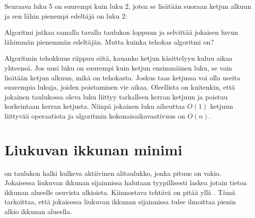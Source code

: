 Seuraava luku 5 on suurempi kuin luku 2,
joten se lisätään suoraan ketjun alkuun ja
sen lähin pienempi edeltäjä on luku 2:
\begin{center}
\end{center}

Algoritmi jatkaa samalla tavalla taulukon loppuun
ja selvittää jokaisen luvun lähimmän
pienemmän edeltäjän.
Mutta kuinka tehokas algoritmi on?

Algoritmin tehokkuus riippuu siitä,
kauanko ketjun käsittelyyn kuluu aikaa yhteensä.
Jos uusi luku on suurempi kuin ketjun ensimmäinen
luku, se vain lisätään ketjun alkuun,
mikä on tehokasta.
Joskus taas ketjussa voi olla useita
suurempia lukuja, joiden poistaminen vie aikaa.
Oleellista on kuitenkin, että jokainen
taulukossa oleva luku liittyy
tarkalleen kerran ketjuun ja poistuu
korkeintaan kerran ketjusta.
Niinpä jokainen luku aiheuttaa $O(1)$
ketjuun liittyvää operaatiota
ja algoritmin kokonaisaikavaativuus on $O(n)$.

\section{Liukuvan ikkunan minimi}


 on taulukon halki kulkeva
aktiivinen alitaulukko, jonka pituus on vakio.
Jokaisessa liukuvan ikkunan sijainnissa
halutaan tyypillisesti laskea jotain tietoa
ikkunan alueelle osuvista alkioista.
Kiinnostava tehtävä on pitää yllä
.
Tämä tarkoittaa, että jokaisessa liukuvan ikkunan
sijainnissa tulee ilmoittaa pienin alkio
ikkunan alueella.

